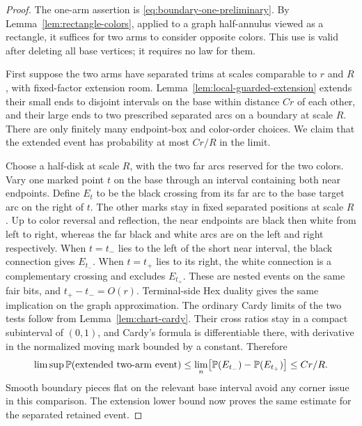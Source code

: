 \begin{proof}
The one-arm assertion is
\eqref{eq:boundary-one-preliminary}.  By
Lemma~\ref{lem:rectangle-colors}, applied to a graph half-annulus
viewed as a rectangle, it suffices for two arms to consider
opposite colors.  This use is valid after deleting all base
vertices; it requires no law for them.

First suppose the two arms have separated trims at scales
comparable to $r$ and $R$, with fixed-factor extension room.
Lemma~\ref{lem:local-guarded-extension} extends their small
ends to disjoint intervals on the base within distance $Cr$
of each other, and their large ends to two prescribed separated
arcs on a boundary at scale $R$.  There are only finitely many
endpoint-box and color-order choices.  We claim that the
extended event has probability at most $Cr/R$ in the limit.

Choose a half-disk at scale $R$, with the two far arcs reserved
for the two colors.  Vary one marked point $t$ on the base
through an interval containing both near endpoints.  Define
$E_t$ to be the black crossing from its far arc to the base
target arc on the right of $t$.  The other marks stay in fixed
separated positions at scale $R$.  Up to color reversal and
reflection, the near endpoints are black then white from left
to right, whereas the far black and white arcs are on the
left and right respectively.  When $t=t_-$ lies to the left
of the short near interval, the black connection gives $E_{t_-}$.
When $t=t_+$ lies to its right, the white connection is a
complementary crossing and excludes $E_{t_+}$.  These are
nested events on the same fair bits, and $t_+-t_-=O(r)$.
Terminal-side Hex duality gives the same implication on the
graph approximation.  The ordinary Cardy limits of the two
tests follow from Lemma~\ref{lem:chart-cardy}.  Their cross
ratios stay in a compact subinterval of $(0,1)$, and Cardy's
formula is differentiable there, with derivative in the
normalized moving mark bounded by a constant.  Therefore
\[
 \limsup\mathbb P(\text{extended two-arm event})
 \le \lim_n\bigl[\mathbb P(E_{t_-})-\mathbb P(E_{t_+})\bigr]
 \le C r/R.
\]
Smooth boundary pieces flat on the relevant base interval
avoid any corner issue in this comparison.  The extension
lower bound now proves the same estimate for the separated
retained event.


\end{proof}
